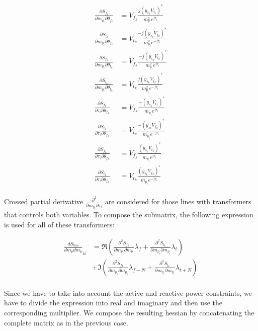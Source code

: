 \begin{equation}
\begin{split}
        \frac{\partial S_{f_k}}{\partial m_{p_i} \partial \theta_{f_k}} &= V_{f_k} \frac{j(y_{s_k}V_{t_k})^*}{m_{p_i}^2 e^{j\tau_i}}  \\
        \frac{\partial S_{t_k}}{\partial m_{p_i} \partial \theta_{f_k}} &= V_{t_k} \frac{-j(y_{s_k}V_{f_k})^*}{m_{p_i}^2 e^{-j\tau_i}} \\
        \frac{\partial S_{f_k}}{\partial m_{p_i} \partial \theta_{t_k}} &= V_{f_k} \frac{-j(y_{s_k}V_{t_k})^*}{m_{p_i}^2 e^{j\tau_i}}  \\
        \frac{\partial S_{t_k}}{\partial m_{p_i} \partial \theta_{t_k}} &= V_{t_k} \frac{j(y_{s_k}V_{f_k})^*}{m_{p_i}^2 e^{-j\tau_i}} \\
        \frac{\partial S_{f_k}}{\partial \tau_i \partial \theta_{f_k}} &= V_{f_k} \frac{-(y_{s_k}V_{t_k})^*}{m_{p_i} e^{j\tau_i}}\\
        \frac{\partial S_{t_k}}{\partial \tau_i \partial \theta_{f_k}} &= V_{t_k} \frac{-(y_{s_k}V_{f_k})^*}{m_{p_i} e^{-j\tau_i}}\\
        \frac{\partial S_{f_k}}{\partial \tau_i \partial \theta_{f_k}} &= V_{f_k} \frac{(y_{s_k}V_{t_k})^*}{m_{p_i} e^{j\tau_i}}\\
        \frac{\partial S_{t_k}}{\partial \tau_i \partial \theta_{f_k}} &= V_{t_k} \frac{(y_{s_k}V_{f_k})^*}{m_{p_i} e^{-j\tau_i}}\\
    \end{split}
    \end{equation}
    
    Crossed partial derivative $\frac{\partial^2}{\partial m_{p_i} \partial \tau_i}$ are considered for those lines with transformers that controls both variables.
    To compose the submatrix, the following expression is used for all of these transformers:
    
    
    \begin{equation}
    \begin{split}
        \frac{dS_{bus}}{dm_pdm_p}_{ii} &= \Re(\frac{\partial^2 S_{f_k}}{\partial m_{p_i} \partial m_{p_i}} \lambda_f + \frac{\partial^2 S_{t_k}}{\partial m_{p_i} \partial m_{p_i}} \lambda_t)\\
        & +  \Im(\frac{\partial^2 S_{f_k}}{\partial m_{p_i} \partial m_{p_i}} \lambda_{f+N} + \frac{\partial^2 S_{t_k}}{\partial m_{p_i} \partial m_{p_i}} \lambda_{t+N}) \\
    \end{split}
    \end{equation}
    
Since we have to take into account the active and reactive power constraints, we have to divide the expression into real and imaginary and then use the corresponding multiplier. We compose the resulting hessian by concatenating the complete matrix as in the previous case.
    


